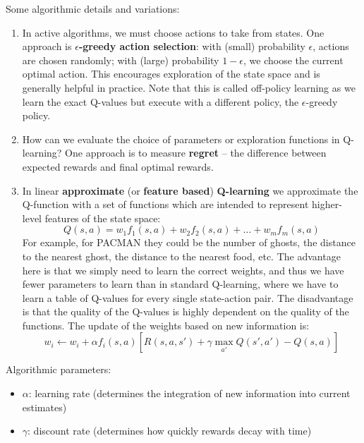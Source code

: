 \documentclass[a4paper]{article}
\begin{document}
\noindent Some algorithmic details and variations:
\begin{enumerate}
    \item In active algorithms, we must choose actions to take from states. One approach is \textbf{$\epsilon$-greedy action selection}: with (small) probability $\epsilon$, actions are chosen randomly; with (large) probability $1 - \epsilon$, we choose the current optimal action. This encourages exploration of the state space and is generally helpful in practice. Note that this is called off-policy learning as we learn the exact Q-values but execute with a different policy, the $\epsilon$-greedy policy.
    \item How can we evaluate the choice of parameters or exploration functions in Q-learning? One approach is to measure \textbf{regret} -- the difference between expected rewards and final optimal rewards.
    \item In linear \textbf{approximate} (or \textbf{feature based}) \textbf{Q-learning} we approximate the Q-function with a set of functions which are intended to represent higher-level features of the state space: 
    \[
    Q(s,a) = w_1 f_1(s,a) + w_2 f_2(s,a) + \dots + w_m f_m(s,a)
    \]
    For example, for PACMAN they could be the number of ghosts, the distance to the nearest ghost, the distance to the nearest food, etc. The advantage here is that we simply need to learn the correct weights, and thus we have fewer parameters to learn than in standard Q-learning, where we have to learn a table of Q-values for every single state-action pair. The disadvantage is that the quality of the Q-values is highly dependent on the quality of the functions. The update of the weights based on new information is:
    \[
    w_i \leftarrow w_i + \alpha f_i(s,a) [R(s, a, s') + \gamma \max_{a'} Q(s', a') - Q(s, a)]
    \]
    
\end{enumerate}

\noindent Algorithmic parameters:
\begin{itemize}
    \item $\alpha$: learning rate (determines the integration of new information into current estimates)
    \item $\gamma$: discount rate (determines how quickly rewards decay with time)
\end{itemize}

\newpage
\end{document}
